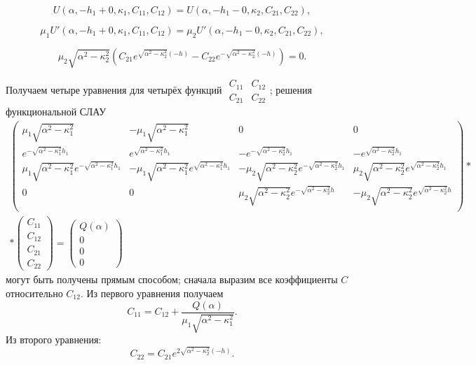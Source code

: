 \documentclass[a4paper, 12pt]{article}
\newcommand{\m}[1]{\mu_{#1}}
\newcommand{\sig}[1]{\sqrt{\alpha^2-\kappa_#1^2}}
\begin{document}
    \begin{equation}
    U(\alpha,-h_1+0,\kappa_1,C_{11},C_{12}) = U(\alpha,-h_1-0,\kappa_2,C_{21},C_{22}),
    \end{equation}

    \begin{equation}
    \mu_1 U'(\alpha,-h_1+0,\kappa_1,C_{11},C_{12}) =\mu_2 U'(\alpha,-h_1-0,\kappa_2,C_{21},C_{22}),
    \end{equation}

    \begin{equation}
    \mu_2 \sqrt{\alpha^2-\kappa_2^2} (C_{21} e^{\sqrt{\alpha^2-\kappa_2^2}(-h)}-C_{22}e^{-\sqrt{\alpha^2-\kappa_2^2}(-h)})=0 .
    \end{equation}

Получаем четыре уравнения для четырёх функций $\begin{matrix} C_{11} & C_{12} \\ C_{21} & C_{22} \end{matrix}$; решения функциональной СЛАУ
\begin{multline}
  \begin{pmatrix} 
\m{1}\sig{1} & -\m{1}\sig{1} & 0 & 0 \\
e^{-\sig{1}h_1} & e^{\sig{1}h_1} & -e^{-\sig{2}h_1} & -e^{\sig{2}h_1}\\
\m{1}\sig{1}e^{-\sig{1}h_1} & -\m{1}\sig{1}e^{\sig{1}h_1} & -\m{2}\sig{2}e^{-\sig{2}h_1} & \m{2}\sig{2}e^{\sig{2}h_1}\\
0 & 0 & \m{2}\sig{2}e^{-\sig{2}h} & -\m{2}\sig{2}e^{\sig{2}h}\\
\end{pmatrix}*\\
*\begin{pmatrix} C_{11} \\ C_{12} \\ C_{21} \\ C_{22} \end{pmatrix}=\begin{pmatrix} Q(\alpha) \\ 0 \\ 0 \\ 0 \end{pmatrix}  
\end{multline}
могут быть получены прямым способом; сначала выразим все коэффициенты $C$ относительно $C_{12}$. Из первого уравнения получаем 
$$C_{11}=C_{12}+\frac{Q(\alpha)}{\mu_1 \sqrt{\alpha^2-\kappa_1^2}}.$$
Из второго уравнения:
$$C_{22}=C_{21} e^{2\sqrt{\alpha^2-\kappa_2^2}(-h)}.$$
\end{document}
